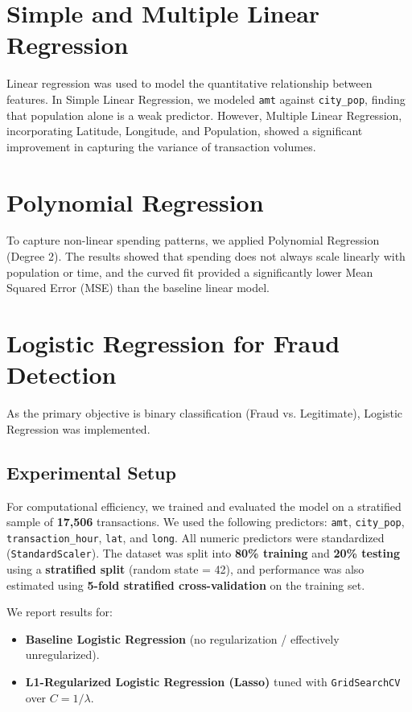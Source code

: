 \documentclass[12pt,a4paper]{report}
\begin{document}
\section{Simple and Multiple Linear Regression}
Linear regression was used to model the quantitative relationship between features. In Simple Linear Regression, we modeled \texttt{amt} against \texttt{city\_pop}, finding that population alone is a weak predictor. However, Multiple Linear Regression, incorporating Latitude, Longitude, and Population, showed a significant improvement in capturing the variance of transaction volumes.

\section{Polynomial Regression}
To capture non-linear spending patterns, we applied Polynomial Regression (Degree 2). The results showed that spending does not always scale linearly with population or time, and the curved fit provided a significantly lower Mean Squared Error (MSE) than the baseline linear model.

\section{Logistic Regression for Fraud Detection}
As the primary objective is binary classification (Fraud vs. Legitimate), Logistic Regression was implemented.

\subsection{Experimental Setup}
For computational efficiency, we trained and evaluated the model on a stratified sample of \textbf{17,506} transactions.
We used the following predictors: \texttt{amt}, \texttt{city\_pop}, \texttt{transaction\_hour}, \texttt{lat}, and \texttt{long}.
All numeric predictors were standardized (\texttt{StandardScaler}).
The dataset was split into \textbf{80\% training} and \textbf{20\% testing} using a \textbf{stratified split} (random state = 42), and performance was also estimated using \textbf{5-fold stratified cross-validation} on the training set.

We report results for:
\begin{itemize}
  \item \textbf{Baseline Logistic Regression} (no regularization / effectively unregularized).
  \item \textbf{L1-Regularized Logistic Regression (Lasso)} tuned with \texttt{GridSearchCV} over $C = 1/\lambda$.
\end{itemize}
\end{document}
